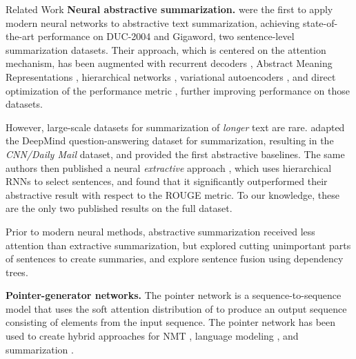 \documentclass[11pt,a4paper]{article}
\begin{document}
\begin{section}{Related Work}
\textbf{Neural abstractive summarization.}
\citeauthor{rush2015neural}  were the first to apply modern neural networks to abstractive text summarization, achieving state-of-the-art performance on DUC-2004 and Gigaword, two sentence-level summarization datasets.
Their approach, which is centered on the attention mechanism, has been augmented with recurrent decoders \cite{chopraabstractive}, Abstract Meaning Representations \cite{takase2016neural}, hierarchical networks \cite{nallapati2016abstractive}, variational autoencoders \cite{miao2016language}, and direct optimization of the performance metric \cite{ranzato2015sequence}, further improving performance on those datasets.

However, large-scale datasets for summarization of \textit{longer} text are rare.
\citeauthor{nallapati2016abstractive}  adapted the DeepMind question-answering dataset \cite{hermann2015teaching} for summarization, resulting in the \textit{CNN\slash Daily Mail} dataset, and provided the first abstractive baselines.
The same authors then published a neural \emph{extractive} approach \cite{nallapati2016summarunner}, which uses hierarchical RNNs to select sentences, and found that it significantly outperformed their abstractive result with respect to the ROUGE metric.
To our knowledge, these are the only two published results on the full dataset.

Prior to modern neural methods, abstractive summarization received less attention than extractive summarization, but \citeauthor{jing2000sentence}  explored cutting unimportant parts of sentences to create summaries, and \citeauthor{cheung2014unsupervised}  explore sentence fusion using dependency trees.

\textbf{Pointer-generator networks.}
The pointer network \cite{vinyals2015pointer} is a sequence-to-sequence model that uses the soft attention distribution of \citeauthor{bahdanau2014neural}  to produce an output sequence consisting of elements from the input sequence.
The pointer network has been used to create hybrid approaches for NMT \cite{gulcehre2016pointing}, language modeling \cite{merity2016pointer}, and summarization \cite{gu2016incorporating,gulcehre2016pointing,miao2016language,nallapati2016abstractive,zeng2016efficient}.


\end{section}
\end{document}
